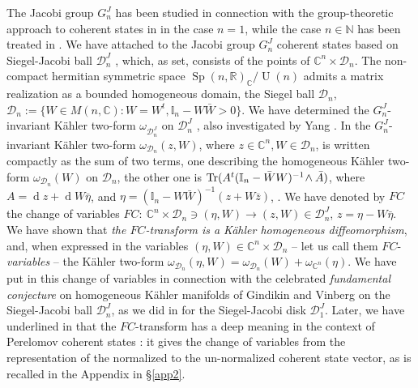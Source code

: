\documentclass[12pt]{amsart}
\numberwithin{equation}{section}
\theoremstyle{definition}
\begin{document}
The  Jacobi group  $G^J_n$ has been   studied  in  connection with the
 group-theoretic approach to coherent states 
\cite{perG} in 
\cite{jac1,FC} in the case $n=1$, while the case $n\in{\ensuremath{\mathbb{N}}}$ has been
treated  in \cite{mlad,sbj,nou}.  We have attached  to the Jacobi group
$G^J_n$ coherent states  based on
Siegel-Jacobi ball  ${{\mathcal{{D}}}}^J_n$ \cite{sbj}, which, as set, consists
of the points of 
${\ensuremath{\mathbb{C}}}^n\times{{\mathcal{{D}}}}_n$.  The non-compact hermitian
symmetric space $ \operatorname{Sp}(n, {\ensuremath{\mathbb{R}}}
)_{\ensuremath{\mathbb{C}}}/\operatorname{U}(n)$ admits a matrix realization  as a bounded
homogeneous domain, the Siegel ball ${{\mathcal{{D}}}}_n$,
${{\mathcal{{D}}}}_n:=\{W\in  M (n, {\ensuremath{\mathbb{C}}} ): W=W^t, {{{\mathbb{I}}_n}}-W\bar{W} > 0\}.$ 
 We have determined the $G^J_n$-invariant
K\"ahler two-form $\omega_{{{\mathcal{{D}}}}^J_n}$ on ${{\mathcal{{D}}}}^J_n$  \cite{sbj}, also 
  investigated  by Yang 
\cite{Y10}. In \cite{mlad,sbj,nou}  the $G^J_n$-invariant K\"ahler
two-form $\omega_{{{\mathcal{{D}}}}_n}(z,W)$,  where $z\in{\ensuremath{\mathbb{C}}}^n, W\in {{\mathcal{{D}}}}_n$, is  written compactly as the sum of two terms, one describing  the homogeneous K\"ahler
two-form   $\omega_{{{\mathcal{{D}}}}_n}(W)$ on 
${{\mathcal{{D}}}}_n$,  the other one is 
${\ensuremath{{\mbox{\rm{Tr}}}}}(A^t({{{\mathbb{I}}_n}}-\bar{W}W)^{-1}\!\wedge\bar{A})$,  where $ A={\operatorname{d}} z +{\operatorname{d}} W\bar{\eta}$, and 
$\eta=({{{\mathbb{I}}_n}}-W\bar{W})^{-1}(z+W \bar{z})$,  \cite{mlad,sbj}. We have 
denoted by $FC$ the change of variables $FC: ~
{\ensuremath{\mathbb{C}}}^n\times{{\mathcal{{D}}}}_n$$\ni 
(\eta,W)\rightarrow$$ (z,W)\in{{\mathcal{{D}}}}^J_n$, $z= \eta-W\bar{\eta}$. We
have shown \cite{nou} that  {\it the $FC$-transform
  is a K\"ahler homogeneous diffeomorphism}, and,  
 when expressed in the variables
$(\eta,W)\in{\ensuremath{\mathbb{C}}}^n\times{{\mathcal{{D}}}}_n$ -- let us call them $FC$-{\it variables} --
the K\"ahler two-form 
$\omega_{{{\mathcal{{D}}}}_n}(\eta,W)=\omega_{{{\mathcal{{D}}}}_n}(W)+\omega_{{\ensuremath{\mathbb{C}}}^n}({\eta})$. 
We have put in \cite{nou}
this change of variables in connection with the celebrated {\it fundamental
conjecture}  on homogeneous K\"ahler manifolds  of Gindikin and
Vinberg \cite{GV,DN} on the Siegel-Jacobi ball ${{\mathcal{{D}}}}^J_n$, 
as we did in \cite{FC} for the Siegel-Jacobi disk ${{\mathcal{{D}}}}^J_1$. Later,
we have underlined in \cite{ber14} that the $FC$-transform has a deep meaning in the
context of Perelomov coherent states  \cite{perG}: it
gives the change of variables from the representation of the normalized
to the un-normalized coherent state vector, as is recalled  in the
Appendix  in \S\ref{app2}.
\end{document}
